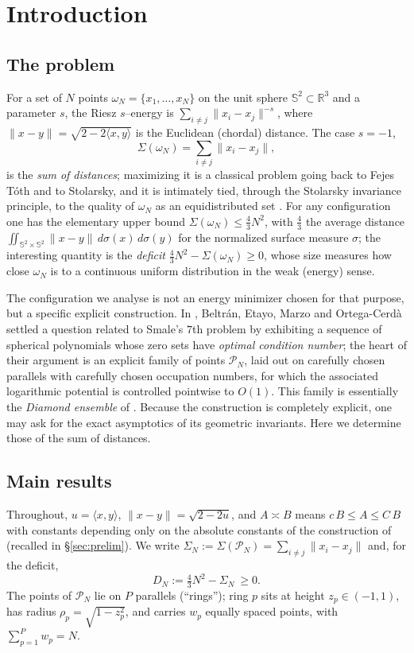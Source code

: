 \documentclass[11pt,reqno]{amsart}
\theoremstyle{definition}
\newcommand{\R}{\mathbb{R}}
\newcommand{\Sph}{\mathbb{S}^2}
\newcommand{\PN}{\mathcal{P}_N}
\newcommand{\dist}[2]{\lVert #1-#2\rVert}
\newcommand{\inner}[2]{\langle #1,#2\rangle}
\newcommand{\Def}{D_N}
\newcommand{\Sig}{\Sigma_N}
\newcommand{\rp}{\rho}
\begin{document}
\section{Introduction}

\subsection{The problem}
For a set of $N$ points $\omega_N=\{x_1,\dots,x_N\}$ on the unit sphere $\Sph\subset\R^3$ and a
parameter $s$, the Riesz $s$--energy is $\sum_{i\ne j}\dist{x_i}{x_j}^{-s}$, where
$\dist{x}{y}=\sqrt{2-2\inner{x}{y}}$ is the Euclidean (chordal) distance. The case $s=-1$,
\[
   \Sigma(\omega_N)=\sum_{i\ne j}\dist{x_i}{x_j},
\]
is the \emph{sum of distances}; maximizing it is a classical problem going back to Fejes T\'oth
and to Stolarsky, and it is intimately tied, through the Stolarsky invariance principle, to the
quality of $\omega_N$ as an equidistributed set \cite{Stolarsky,BeckSphere,BilykDaiMatzke}. For any
configuration one has the elementary upper bound $\Sigma(\omega_N)\le\frac43N^2$, with $\frac43$ the
average distance $\iint_{\Sph\times\Sph}\dist{x}{y}\,d\sigma(x)\,d\sigma(y)$ for the normalized
surface measure $\sigma$; the interesting quantity is the \emph{deficit}
$\frac43N^2-\Sigma(\omega_N)\ge 0$, whose size measures how close $\omega_N$ is to a continuous
uniform distribution in the weak (energy) sense.

The configuration we analyse is not an energy minimizer chosen for that purpose, but a specific
explicit construction. In \cite{BEMOC}, Beltr\'an, Etayo, Marzo and Ortega-Cerd\`a settled a
question related to Smale's $7$th problem \cite{Smale} by exhibiting a sequence of spherical
polynomials whose zero sets have \emph{optimal condition number}; the heart of their argument is an
explicit family of points $\PN$, laid out on carefully chosen parallels with carefully chosen
occupation numbers, for which the associated logarithmic potential is controlled pointwise to
$O(1)$. This family is essentially the \emph{Diamond ensemble} of \cite{Diamond}. Because the
construction is completely explicit, one may ask for the exact asymptotics of its geometric
invariants. Here we determine those of the sum of distances.

\subsection{Main results}
Throughout, $u=\inner{x}{y}$, $\dist{x}{y}=\sqrt{2-2u}$, and $A\asymp B$ means
$c\,B\le A\le C\,B$ with constants depending only on the absolute constants of the construction
of \cite{BEMOC} (recalled in \S\ref{sec:prelim}). We write
$\Sig:=\Sigma(\PN)=\sum_{i\ne j}\dist{x_i}{x_j}$ and, for the deficit,
\[
   \Def:=\tfrac43N^2-\Sig\ \ge 0 .
\]
The points of $\PN$ lie on $P$ parallels (``rings''); ring $p$ sits at height $z_p\in(-1,1)$,
has radius $\rp_p=\sqrt{1-z_p^2}$, and carries $w_p$ equally spaced points, with
$\sum_{p=1}^P w_p=N$.
\end{document}
